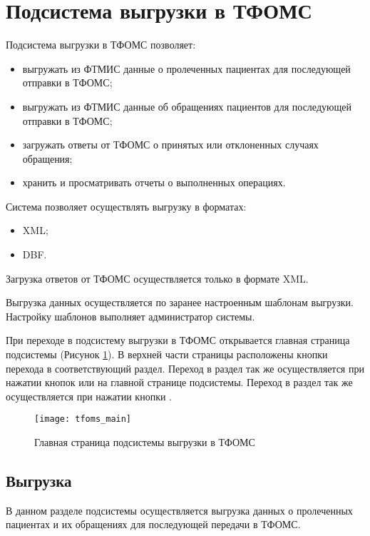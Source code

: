 \newpage
\section{Подсистема выгрузки в ТФОМС}

Подсистема выгрузки в ТФОМС позволяет:
\begin{itemize}
 \item выгружать из ФТМИС данные о пролеченных пациентах для последующей отправки в ТФОМС;
 \item выгружать из ФТМИС данные об обращениях пациентов для последующей отправки в ТФОМС;
 \item загружать ответы от ТФОМС о принятых или отклоненных случаях обращения;
 \item хранить и просматривать отчеты о выполненных операциях.
\end{itemize}
 
Система позволяет осуществлять выгрузку в форматах:
\begin{itemize}
 \item XML;
 \item DBF.
\end{itemize}
 
Загрузка ответов от ТФОМС осуществляется только в формате XML.

Выгрузка данных осуществляется по заранее настроенным шаблонам выгрузки. Настройку шаблонов выполняет администратор системы.

При переходе в подсистему выгрузки в ТФОМС открывается главная страница подсистемы (Рисунок \ref{img_tfoms_main}). В верхней части страницы расположены кнопки перехода в соответствующий раздел. Переход в раздел  так же осуществляется при нажатии кнопок  или   на главной странице подсистемы. Переход в раздел  так же осуществляется при нажатии кнопки .  

\begin{figure}[ht]\centering
 \texttt{[image: tfoms\_main]}
 \caption{Главная страница подсистемы выгрузки в ТФОМС}
 \label{img_tfoms_main}
\end{figure} 

\subsection{Выгрузка}

В данном разделе подсистемы осуществляется выгрузка данных о пролеченных пациентах и их обращениях для последующей передачи в ТФОМС.

